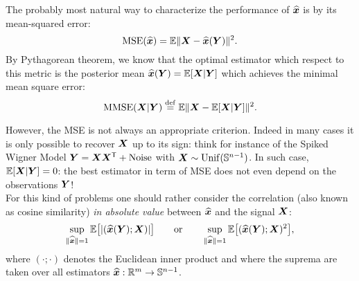 \documentclass[12pt,nocut]{article}
\begin{document}
The probably most natural way to characterize the performance of $\widehat{{\boldsymbol x}}$ is by its mean-squared error:
$$
{{\rm MSE}}(\widehat{{\boldsymbol x}}) = \mathbb{E} \| {\boldsymbol X} - \widehat{{\boldsymbol x}}({\boldsymbol Y}) \|^2.
$$
By Pythagorean theorem, we know that the optimal estimator which respect to this metric is the posterior mean $\widehat{{\boldsymbol x}}({\boldsymbol Y}) = \mathbb{E}[{\boldsymbol X}| {\boldsymbol Y}]$ which achieves the minimal mean square error:
\begin{equation}\label{eq:def_mmse0}
	{{\rm MMSE}}({\boldsymbol X}|{\boldsymbol Y}) \overset{{\rm def}}{=} \mathbb{E} \| {\boldsymbol X} - \mathbb{E}[{\boldsymbol X}|{\boldsymbol Y}] \|^2.
\end{equation}

However, the MSE is not always an appropriate criterion. Indeed in many cases it is only possible to recover ${\boldsymbol X}$ up to its sign: think for instance of the Spiked Wigner Model ${\boldsymbol Y} = {\boldsymbol X}{\boldsymbol X}^{{\sf T}} + {\rm Noise}$ with ${\boldsymbol X} \sim {\rm Unif}(\mathbb{S}^{n-1})$. In such case, $\mathbb{E}[{\boldsymbol X}|{\boldsymbol Y}] = 0$: the best estimator in term of MSE does not even depend on the observations ${\boldsymbol Y}$!
\\

For this kind of problems one should rather consider the correlation (also known as cosine similarity) \textit{in absolute value} between $\widehat{{\boldsymbol x}}$ and the signal ${\boldsymbol X}$:
\begin{equation}\label{eq:correlation_metric}
\sup_{\|\widehat{{\boldsymbol x}}\| = 1} \mathbb{E}\big[|(\widehat{{\boldsymbol x}}({\boldsymbol Y}); {\boldsymbol X})|\big]
\qquad \text{or} \qquad
\sup_{\|\widehat{{\boldsymbol x}}\| = 1} \mathbb{E}\big[(\widehat{{\boldsymbol x}}({\boldsymbol Y}); {\boldsymbol X})^2\big],
\end{equation}
where $(\cdot; \cdot)$ denotes the Euclidean inner product and where the suprema are taken over all estimators $\widehat{{\boldsymbol x}}: \mathbb{R}^m \to \mathbb{S}^{n-1}$.
\\
\end{document}
